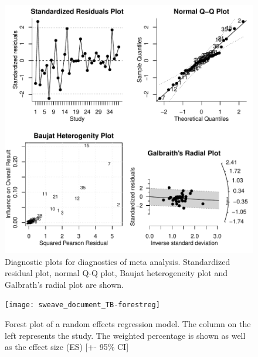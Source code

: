 \documentclass[11pt, a4paper]{article} %
\begin{document}
\begin{figure}
\captionsetup{width=0.6\textwidth}
\centering
\includegraphics[width=1\textwidth]{sweave_document_TB-diagnostics}
\caption{Diagnostic plots for diagnostics of meta analysis. Standardized residual plot, normal Q-Q plot, Baujat heterogeneity plot and Galbrath's radial plot are shown.}
\label{fig:diagnostics}
\end{figure}


\begin{figure}
\captionsetup{width=0.6\textwidth}
\centering
\texttt{[image: sweave\_document\_TB-forestreg]}
\caption{Forest plot of a random effects regression model. The column on the left represents the study. The weighted percentage is shown as well as the effect size (ES) [+- 95\% CI]}
\label{fig:forestplotreg}
\end{figure}


  
\end{document}
